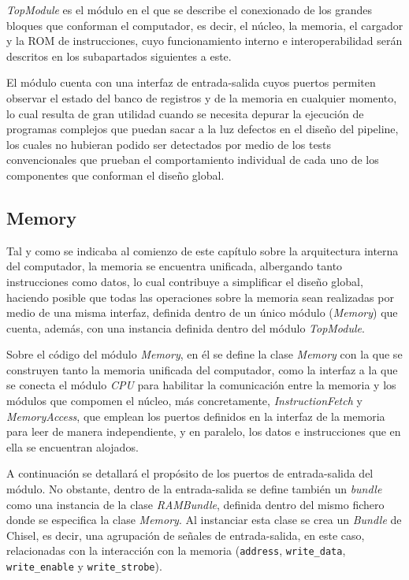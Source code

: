 \textit{TopModule} es el módulo en el que se describe el conexionado de los grandes bloques que conforman el computador, es decir, el núcleo, la memoria, el cargador y la ROM de instrucciones, cuyo funcionamiento interno e interoperabilidad serán descritos en los subapartados siguientes a este.

El módulo cuenta con una interfaz de entrada-salida cuyos puertos permiten observar el estado del banco de registros y de la memoria en cualquier momento, lo cual resulta de gran utilidad cuando se necesita depurar la ejecución de programas complejos que puedan sacar a la luz defectos en el diseño del pipeline, los cuales no hubieran podido ser detectados por medio de los tests convencionales que prueban el comportamiento individual de cada uno de los componentes que conforman el diseño global.

\subsection{Memory}

Tal y como se indicaba al comienzo de este capítulo sobre la arquitectura interna del computador, la memoria se encuentra unificada, albergando tanto instrucciones como datos, lo cual contribuye a simplificar el diseño global, haciendo posible que todas las operaciones sobre la memoria sean realizadas por medio de una misma interfaz, definida dentro de un único módulo (\textit{Memory}) que cuenta, además, con una instancia definida dentro del módulo \textit{TopModule}.

Sobre el código del módulo \textit{Memory}, en él se define la clase \textit{Memory} con la que se construyen tanto la memoria unificada del computador, como la interfaz a la que se conecta el módulo \textit{CPU} para habilitar la comunicación entre la memoria y los módulos que compomen el núcleo, más concretamente, \textit{InstructionFetch} y \textit{MemoryAccess}, que emplean los puertos definidos en la interfaz de la memoria para leer de manera independiente, y en paralelo, los datos e instrucciones que en ella se encuentran alojados.

A continuación se detallará el propósito de los puertos de entrada-salida del módulo. No obstante, dentro de la entrada-salida se define también un \textit{bundle} como una instancia de la clase \textit{RAMBundle}, definida dentro del mismo fichero donde se especifica la clase \textit{Memory}. Al instanciar esta clase se crea un \textit{Bundle} de Chisel, es decir, una agrupación de señales de entrada-salida, en este caso, relacionadas con la interacción con la memoria (\texttt{address}, \texttt{write\_data}, \texttt{write\_enable} y \texttt{write\_strobe}).

